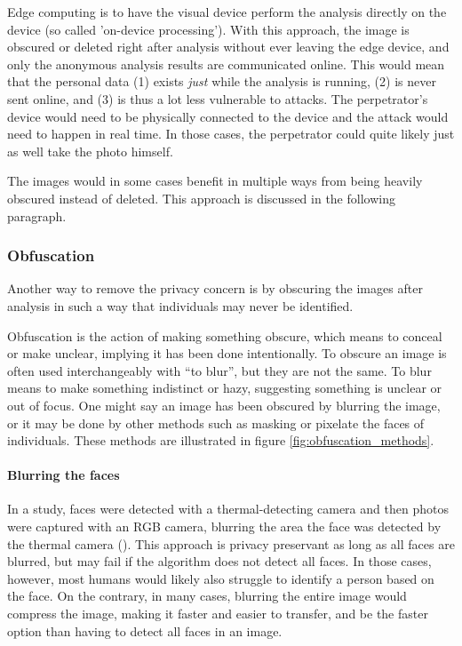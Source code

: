 Edge computing is to have the visual device perform the analysis directly on the device (so called 'on-device processing'). With this approach, the image is obscured or deleted right after analysis without ever leaving the edge device, and only the anonymous analysis results are communicated online. This would mean that the personal data (1) exists \textit{just} while the analysis is running, (2) is never sent online, and (3) is thus a lot less vulnerable to attacks. The perpetrator's device would need to be physically connected to the device and the attack would need to happen in real time. In those cases, the perpetrator could quite likely just as well take the photo himself.

The images would in some cases benefit in multiple ways from being heavily obscured instead of deleted. This approach is discussed in the following paragraph.

\subsubsection{Obfuscation}
\label{sec:obfuscation}
Another way to remove the privacy concern is by obscuring the images after analysis in such a way that individuals may never be identified.

Obfuscation is the action of making something obscure, which means to conceal or make unclear, implying it has been done intentionally. To obscure an image is often used interchangeably with “to blur”, but they are not the same. To blur means to make something indistinct or hazy, suggesting something is unclear or out of focus. One might say an image has been obscured by blurring the image, or it may be done by other methods such as masking or pixelate the faces of individuals. These methods are illustrated in figure \ref{fig:obfuscation_methods}.

\paragraph{Blurring the faces}
In a \citeyear{ma2019fall_anonymous} study, faces were detected with a thermal-detecting camera and then photos were captured with an RGB camera, blurring the area the face was detected by the thermal camera (\citeauthor{ma2019fall_anonymous}). This approach is privacy preservant as long as all faces are blurred, but may fail if the algorithm does not detect all faces. In those cases, however, most humans would likely also struggle to identify a person based on the face. On the contrary, in many cases, blurring the entire image would compress the image, making it faster and easier to transfer, and be the faster option than having to detect all faces in an image.

